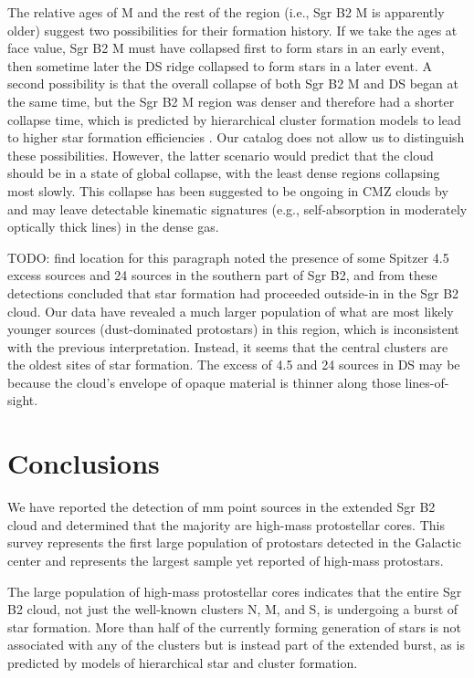 \documentclass[twocolumn]{aastex61}
\begin{document}
The relative ages of M and the rest of the region (i.e., Sgr B2 M is apparently
older) suggest two possibilities for their formation history.  If we take the
ages at face value, Sgr B2 M must have collapsed first to form stars in an
early event, then sometime later the DS ridge collapsed to form stars in a
later event.  A second possibility is that the overall collapse of both Sgr B2
M and DS began at the same time, but the Sgr B2 M region was denser and
therefore had a shorter collapse time, which is predicted by hierarchical
cluster formation models to lead to higher star formation efficiencies
\citep{Kruijssen2012a}.  Our catalog does not allow us to distinguish these
possibilities.  However, the latter scenario would predict that the cloud
should be in a state of global collapse, with the least dense regions
collapsing most slowly.  This collapse has been suggested to be ongoing in CMZ
clouds by \citet{Walker2015a,Walker2016a} and may leave detectable kinematic
signatures (e.g., self-absorption in moderately optically thick lines) in the
dense gas.


{\color{red} TODO: find location for this paragraph}
\citet{Yusef-Zadeh2013a} noted the presence of some Spitzer 4.5 \um
excess sources and 24 \um sources in the southern part of Sgr B2, 
and from these detections concluded that star formation had proceeded
outside-in in the Sgr B2 cloud.  Our data have revealed a much larger
population of what are most likely younger sources (dust-dominated protostars)
in this region, which is inconsistent with the previous interpretation.
Instead, it seems that the central clusters are the oldest sites of star
formation.  The excess of 4.5 \um and 24 \um sources in DS may be because the
cloud's envelope of opaque material is thinner along those lines-of-sight.

\section{Conclusions}
We have reported the detection of  mm point sources in the extended
Sgr B2 cloud and determined that the majority are high-mass protostellar
cores.  This survey represents the first large population of protostars
detected in the Galactic center and represents the largest sample yet reported
of high-mass protostars.

The large population of high-mass protostellar cores indicates that the entire
Sgr B2 cloud, not just the well-known clusters N, M, and S, is undergoing a
burst of star formation.  More than half of the currently forming generation of
stars is not associated with any of the clusters but is instead part of the
extended burst, as is predicted by models of hierarchical star and cluster
formation.
\end{document}
